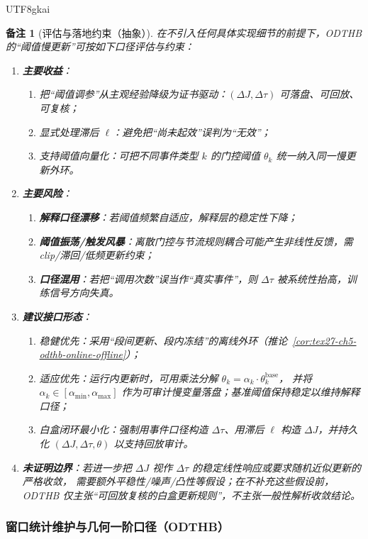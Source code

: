 \documentclass[12pt]{article}
\newtheorem{remark}{备注}[section]
\begin{document}
\begin{CJK*}{UTF8}{gkai}
\begin{remark}[评估与落地约束（抽象）]
在不引入任何具体实现细节的前提下，ODTHB 的“阈值慢更新”可按如下口径评估与约束：
\begin{enumerate}
  \raggedright
  \item \textbf{主要收益}：
  \begin{enumerate}
    \item 把“阈值调参”从主观经验降级为证书驱动：$(\Delta J,\Delta\tau)$ 可落盘、可回放、可复核；
    \item 显式处理滞后 $\ell$：避免把“尚未起效”误判为“无效”；
    \item 支持阈值向量化：可把不同事件类型 $k$ 的门控阈值 $\theta_k$ 统一纳入同一慢更新外环。
  \end{enumerate}
  \item \textbf{主要风险}：
  \begin{enumerate}
    \item \textbf{解释口径漂移}：若阈值频繁自适应，解释层的稳定性下降；
    \item \textbf{阈值振荡/触发风暴}：离散门控与节流规则耦合可能产生非线性反馈，需 clip/滞回/低频更新约束；
    \item \textbf{口径混用}：若把“调用次数”误当作“真实事件”，则 $\Delta\tau$ 被系统性抬高，训练信号方向失真。
  \end{enumerate}
  \item \textbf{建议接口形态}：
  \begin{enumerate}
    \item 稳健优先：采用“段间更新、段内冻结”的离线外环（推论~\ref{cor:tex27-ch5-odthb-online-offline}）；
    \item 适应优先：运行内更新时，可用乘法分解 $\theta_k=\alpha_k\cdot\theta^{\mathrm{base}}_k$，
    并将 $\alpha_k\in[\alpha_{\min},\alpha_{\max}]$ 作为可审计慢变量落盘；基准阈值保持稳定以维持解释口径；
    \item 白盒闭环最小化：强制用事件口径构造 $\Delta\tau$、用滞后 $\ell$ 构造 $\Delta J$，并持久化 $(\Delta J,\Delta\tau,\theta)$ 以支持回放审计。
  \end{enumerate}
  \item \textbf{未证明边界}：若进一步把 $\Delta J$ 视作 $\Delta\tau$ 的稳定线性响应或要求随机近似更新的严格收敛，
  需要额外平稳性/噪声/凸性等假设；在不补充这些假设前，ODTHB 仅主张“可回放复核的白盒更新规则”，不主张一般性解析收敛结论。
\end{enumerate}
\end{remark}

\subsubsection{窗口统计维护与几何一阶口径（ODTHB）}
\label{subsubsec:tex27-ch5-odthb-window-stats}


\end{CJK*}
\end{document}
